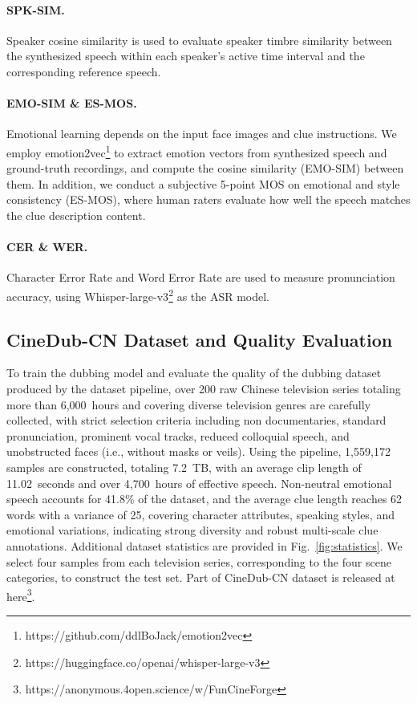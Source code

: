 \documentclass{article}
\begin{document}
\paragraph{SPK-SIM.}
Speaker cosine similarity is used to evaluate speaker timbre similarity between the synthesized speech 
within each speaker's active time interval and the corresponding reference speech.

\paragraph{EMO-SIM \& ES-MOS.}
Emotional learning depends on the input face images and clue instructions.
We employ emotion2vec\footnote{https://github.com/ddlBoJack/emotion2vec} to 
extract emotion vectors from synthesized speech and ground-truth recordings,
and compute the cosine similarity (EMO-SIM) between them.
In addition, we conduct a subjective 5-point MOS on emotional and style consistency (ES-MOS),
where human raters evaluate how well the speech matches the clue description content.

\paragraph{CER \& WER.}
Character Error Rate and Word Error Rate are used to measure pronunciation accuracy, 
using Whisper-large-v3\footnote{https://huggingface.co/openai/whisper-large-v3} as the ASR model.


\subsection{CineDub-CN Dataset and Quality Evaluation}
To train the dubbing model and evaluate the quality of the dubbing dataset produced by the dataset pipeline,
over 200 raw Chinese television series totaling more than 6,000~hours and covering diverse television genres are carefully collected,
with strict selection criteria including non documentaries, standard pronunciation, prominent vocal tracks, reduced colloquial speech,
and unobstructed faces (i.e., without masks or veils).
Using the pipeline, 1,559,172 samples are constructed, totaling 7.2~TB, with an average clip length of 11.02~seconds
and over 4,700~hours of effective speech.
Non-neutral emotional speech accounts for 41.8\% of the dataset, and
the average clue length reaches 62 words with a variance of 25, covering character attributes, speaking styles, and emotional variations,
indicating strong diversity and robust multi-scale clue annotations.
Additional dataset statistics are provided in Fig.~\ref{fig:statistics}.
We select four samples from each television series, corresponding to the four scene categories, to construct the test set.
Part of CineDub-CN dataset is released at here\footnote{https://anonymous.4open.science/w/FunCineForge}.
\end{document}
